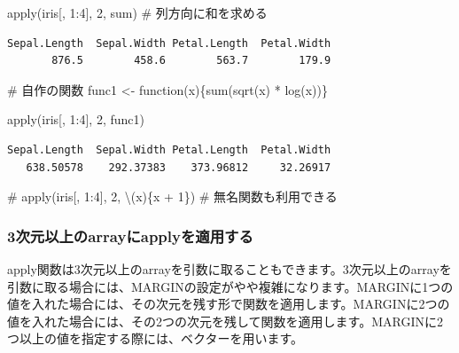 \documentclass[
  letterpaper,
  DIV=11,
  numbers=noendperiod]{scrreprt}
\newenvironment{Shaded}{\begin{snugshade}}{\end{snugshade}}
\newcommand{\CommentTok}[1]{\textcolor[rgb]{0.37,0.37,0.37}{#1}}
\newcommand{\ControlFlowTok}[1]{\textcolor[rgb]{0.00,0.23,0.31}{#1}}
\newcommand{\DecValTok}[1]{\textcolor[rgb]{0.68,0.00,0.00}{#1}}
\newcommand{\FunctionTok}[1]{\textcolor[rgb]{0.28,0.35,0.67}{#1}}
\newcommand{\NormalTok}[1]{\textcolor[rgb]{0.00,0.23,0.31}{#1}}
\newcommand{\OtherTok}[1]{\textcolor[rgb]{0.00,0.23,0.31}{#1}}
\newcommand{\SpecialCharTok}[1]{\textcolor[rgb]{0.37,0.37,0.37}{#1}}
\begin{document}
\begin{Shaded}
\begin{Highlighting}[]
\FunctionTok{apply}\NormalTok{(iris[, }\DecValTok{1}\SpecialCharTok{:}\DecValTok{4}\NormalTok{], }\DecValTok{2}\NormalTok{, sum) }\CommentTok{\# 列方向に和を求める}
\end{Highlighting}
\end{Shaded}

\begin{verbatim}
Sepal.Length  Sepal.Width Petal.Length  Petal.Width 
       876.5        458.6        563.7        179.9 
\end{verbatim}

\begin{Shaded}
\begin{Highlighting}[]
\CommentTok{\# 自作の関数}
\NormalTok{func1 }\OtherTok{\textless{}{-}} \ControlFlowTok{function}\NormalTok{(x)\{}\FunctionTok{sum}\NormalTok{(}\FunctionTok{sqrt}\NormalTok{(x) }\SpecialCharTok{*} \FunctionTok{log}\NormalTok{(x))\}}

\FunctionTok{apply}\NormalTok{(iris[, }\DecValTok{1}\SpecialCharTok{:}\DecValTok{4}\NormalTok{], }\DecValTok{2}\NormalTok{, func1)}
\end{Highlighting}
\end{Shaded}

\begin{verbatim}
Sepal.Length  Sepal.Width Petal.Length  Petal.Width 
   638.50578    292.37383    373.96812     32.26917 
\end{verbatim}

\begin{Shaded}
\begin{Highlighting}[]
\CommentTok{\# apply(iris[, 1:4], 2, \textbackslash{}(x)\{x + 1\}) \# 無名関数も利用できる}
\end{Highlighting}
\end{Shaded}

\hypertarget{ux6b21ux5143ux4ee5ux4e0aux306earrayux306bapplyux3092ux9069ux7528ux3059ux308b}{%
\subsubsection{3次元以上のarrayにapplyを適用する}\label{ux6b21ux5143ux4ee5ux4e0aux306earrayux306bapplyux3092ux9069ux7528ux3059ux308b}}

apply関数は3次元以上のarrayを引数に取ることもできます。3次元以上のarrayを引数に取る場合には、MARGINの設定がやや複雑になります。MARGINに1つの値を入れた場合には、その次元を残す形で関数を適用します。MARGINに2つの値を入れた場合には、その2つの次元を残して関数を適用します。MARGINに2つ以上の値を指定する際には、ベクターを用います。
\end{document}
